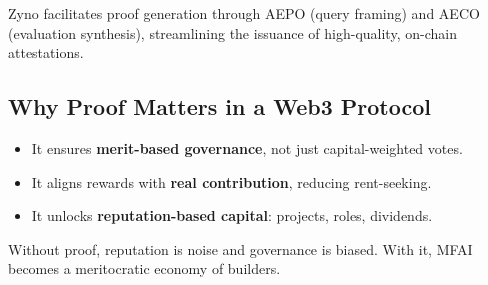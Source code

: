 \vspace{1em}

\begin{mfai-note}
Zyno facilitates proof generation through AEPO (query framing) and AECO (evaluation synthesis), streamlining the issuance of high-quality, on-chain attestations.
\end{mfai-note}

\vspace{2em}

\subsection*{Why Proof Matters in a Web3 Protocol}

\begin{itemize}
  \item It ensures \textbf{merit-based governance}, not just capital-weighted votes.
  \item It aligns rewards with \textbf{real contribution}, reducing rent-seeking.
  \item It unlocks \textbf{reputation-based capital}: projects, roles, dividends.
\end{itemize}

\vspace{2em}

\begin{mfai-warning}
Without proof, reputation is noise and governance is biased. With it, MFAI becomes a meritocratic economy of builders.
\end{mfai-warning}
